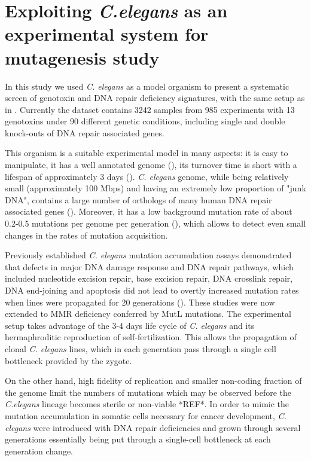 
\section{Exploiting \textit{C.elegans} as an experimental system for mutagenesis study}

In this study we used \textit{C. elegans} as a model organism to present a systematic 
screen of genotoxin and DNA repair deficiency signatures, with the same setup as in 
\cite{Meier1}. Currently the dataset contains 3242 samples from 985 experiments with 
13 genotoxins under 90 different genetic conditions, including single and double 
knock-outs of DNA repair associated genes. 


This organism is a suitable experimental model in many aspects: it is easy to manipulate, 
it has a well annotated genome (\cite{antoshechkin2007versatile}), its turnover time is short with a lifespan of 
approximately 3 days (\cite{hope1999c}). \textit{C. elegans} genome, while 
being relatively small (approximately 100 Mbps) and having an extremely low proportion 
of "junk DNA", contains a large number of orthologs of 
many human DNA repair associated genes (\cite{kaletta2006finding}). Moreover, it has a low
background mutation rate of about 0.2-0.5 mutations per genome per generation (\cite{denver2009genome}), 
which allows to detect even small changes in the rates of mutation acquisition.

Previously established \textit{C. elegans} mutation accumulation assays demonstrated 
that defects in major DNA damage response and DNA repair pathways, which included 
nucleotide excision repair, base excision repair, DNA crosslink repair, DNA end-joining 
and apoptosis did not lead to overtly increased mutation rates when lines were propagated 
for 20 generations (\cite{Meier2014-aa}). These studies were now extended to MMR deficiency 
conferred by MutL mutations. The experimental setup takes advantage of the 3-4 days 
life cycle of \textit{C. elegans} and its hermaphroditic reproduction of self-fertilization. 
This allows the propagation of clonal \textit{C. elegans} lines, which in each 
generation pass through a single cell bottleneck provided by the zygote. 

On the other hand, high fidelity of replication and smaller non-coding fraction of the genome 
limit the numbers of mutations which may be observed before the \textit{C.elegans} lineage 
becomes sterile or non-viable *REF*. In order to mimic the mutation accumulation in somatic 
cells necessary for cancer development, \textit{C. elegans} were introduced with DNA repair 
deficiencies and grown through several generations essentially being put through a single-cell 
bottleneck at each generation change.

